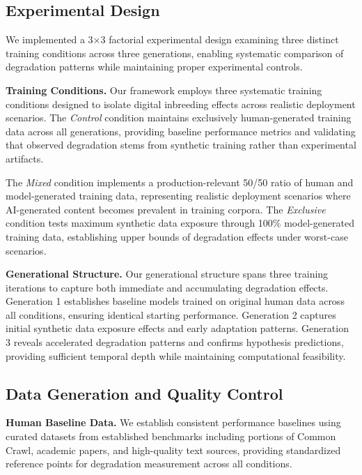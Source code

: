 \documentclass{article}
\begin{document}
\subsection{Experimental Design}

We implemented a 3×3 factorial experimental design examining three distinct training conditions across three generations, enabling systematic comparison of degradation patterns while maintaining proper experimental controls.

\textbf{Training Conditions.} Our framework employs three systematic training conditions designed to isolate digital inbreeding effects across realistic deployment scenarios. The \textit{Control} condition maintains exclusively human-generated training data across all generations, providing baseline performance metrics and validating that observed degradation stems from synthetic training rather than experimental artifacts. 

The \textit{Mixed} condition implements a production-relevant 50/50 ratio of human and model-generated training data, representing realistic deployment scenarios where AI-generated content becomes prevalent in training corpora. The \textit{Exclusive} condition tests maximum synthetic data exposure through 100\% model-generated training data, establishing upper bounds of degradation effects under worst-case scenarios.

\textbf{Generational Structure.} Our generational structure spans three training iterations to capture both immediate and accumulating degradation effects. Generation 1 establishes baseline models trained on original human data across all conditions, ensuring identical starting performance. Generation 2 captures initial synthetic data exposure effects and early adaptation patterns. Generation 3 reveals accelerated degradation patterns and confirms hypothesis predictions, providing sufficient temporal depth while maintaining computational feasibility.

\subsection{Data Generation and Quality Control}

\textbf{Human Baseline Data.} We establish consistent performance baselines using curated datasets from established benchmarks including portions of Common Crawl, academic papers, and high-quality text sources, providing standardized reference points for degradation measurement across all conditions.
\end{document}
